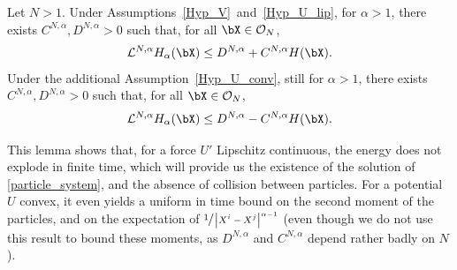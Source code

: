 \begin{lemma}\label{lya_alpha}
Let $N>1$. Under Assumptions~\ref{Hyp_V}~and~\ref{Hyp_U_lip}, for $\alpha>1$, there exists $C^{N,\alpha},D^{N,\alpha}>0$ such that, for all $\bX\in\mathcal{O}_N$,
\begin{align*}
\mathcal{L}^{N,\alpha} H_{\alpha}(\bX)\leq D^{N,\alpha}+C^{N,\alpha}H(\bX).
\end{align*}
Under the additional Assumption~\ref{Hyp_U_conv}, still for $\alpha>1$, there exists $C^{N,\alpha},D^{N,\alpha}>0$ such that, for all $\bX\in\mathcal{O}_N$,
\begin{align*}
\mathcal{L}^{N,\alpha} H_{\alpha}(\bX)\leq D^{N,\alpha}-C^{N,\alpha}H(\bX).
\end{align*}
\end{lemma}

This lemma shows that, for a force $U'$ Lipschitz continuous, the energy does not explode in finite time, which will provide us the existence of the solution of \eqref{particle_system}, and the absence of collision between particles. For a potential $U$ convex, it even yields a uniform in time bound on the second moment of the particles, and on the expectation of $\sfrac{1}{\left|X^i-X^j\right|^{\alpha-1}}$ (even though we do not use this result to bound these moments, as $D^{N,\alpha}$ and $C^{N,\alpha}$ depend rather badly on $N$).

